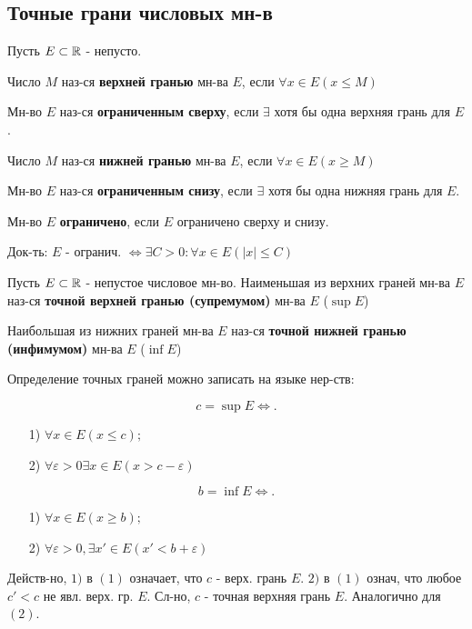\subsection{Точные грани числовых мн-в}
\begin{definition}
Пусть $E \subset \mathbb{R}$ - непусто.

Число $M$ наз-ся \textbf{верхней гранью} мн-ва $E$, если $\forall x \in E (x \leq M)$

Мн-во $E$ наз-ся \textbf{ограниченным сверху}, если $\exists $ хотя бы одна верхняя грань для $E$.

Число $M$ наз-ся \textbf{нижней гранью} мн-ва $E$, если $\forall x \in E (x \geq M)$

Мн-во $E$ наз-ся \textbf{ограниченным снизу}, если $\exists $ хотя бы одна нижняя грань для $E$.

Мн-во $E$ \textbf{ограничено}, если $E$ ограничено сверху и снизу.
\end{definition}
\begin{task}
Док-ть: $E \text{ - огранич. } \iff \exists C > 0 \colon  \forall x \in E (|x| \leq C)$
\end{task}

\begin{definition}
Пусть $E \subset \mathbb{R}$ - непустое числовое мн-во. Наименьшая из верхних граней мн-ва $E$ наз-ся \textbf{точной верхней гранью (супремумом)} мн-ва $E$ ($\sup E$)

Наибольшая из нижних граней мн-ва $E$ наз-ся \textbf{точной нижней гранью (инфимумом)} мн-ва $E$ ($\inf E$)
\end{definition}
\begin{note}
Определение точных граней можно записать на языке нер-ств:

\begin{equation}
    c = \sup E \iff
    .
\end{equation}
\begin{enumerate}
    \item [1) ] $\forall x \in E (x \leq c);$ 
    \item [2) ] $\forall  \varepsilon > 0  \exists  x \in E (x > c - \varepsilon)$
\end{enumerate}


\begin{equation}
b = \inf E \iff
.\end{equation} 
\begin{enumerate}
    \item [1) ] $\forall x \in E (x \geq b);$ 
    \item [2) ] $\forall \varepsilon > 0, \exists x' \in E (x' < b + \varepsilon)$
\end{enumerate}

Действ-но, $1)$ в $(1)$ означает, что $c$ - верх. грань $E$. $2)$ в $(1)$ означ, что любое $c' < c$ не явл. верх. гр. $E$. Сл-но, $c$ - точная верхняя грань $E$. Аналогично для  $(2)$.
\end{note}

